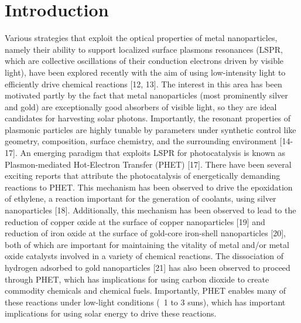 \documentclass[journal=jpclcd,manuscript=letter]{achemso}
\begin{document}


\section{Introduction}
Various strategies that exploit the optical properties of metal nanoparticles, namely their ability to support localized surface plasmons resonances (LSPR, which are collective oscillations of their 
conduction electrons driven by visible light), have been explored recently with the aim of using low-intensity light to efficiently drive chemical reactions [12, 13].  The interest in this area has 
been motivated partly by the fact that metal nanoparticles (most prominently silver and gold) are exceptionally good absorbers of visible light, so they are ideal candidates for harvesting solar photons.  
Importantly, the resonant properties of plasmonic particles are highly tunable by parameters under synthetic control like geometry, composition, surface chemistry, and the surrounding 
environment [14-17].  An emerging paradigm that exploits LSPR for photocatalysis is known as Plasmon-mediated Hot-Electron Transfer (PHET) [17].  There have been several exciting 
reports that attribute the photocatalysis of energetically demanding reactions to PHET.   This mechanism has been observed to drive the epoxidation of ethylene, a reaction important 
for the generation of coolants, using silver nanoparticles [18].  Additionally, this mechanism has been observed to lead to the reduction of copper oxide at the surface of 
copper nanoparticles [19] and reduction of iron oxide at the surface of gold-core iron-shell nanoparticles [20], both of which are important for maintaining the vitality of 
metal and/or metal oxide catalysts involved in a variety of chemical reactions.   The dissociation of hydrogen adsorbed to gold nanoparticles [21] has also been observed to 
proceed through PHET, which has implications for using carbon dioxide to create commodity chemicals and chemical fuels.  Importantly, PHET enables many of these reactions 
under low-light conditions (~1 to 3 suns), which has important implications for using solar energy to drive these reactions.  
   
\end{document}
